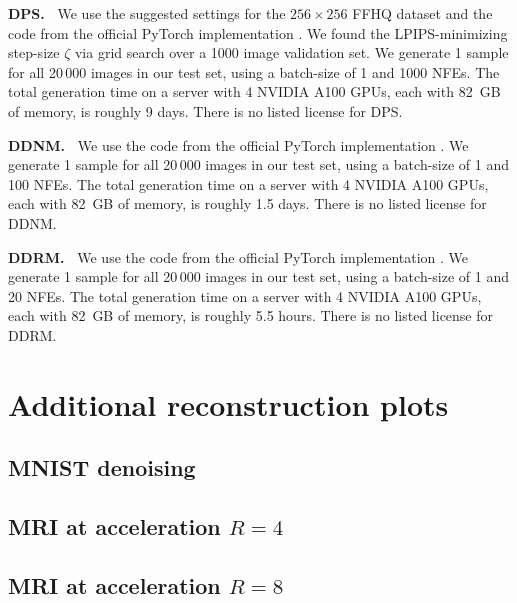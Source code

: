 \documentclass{article}
\theoremstyle{plain}
\theoremstyle{definition}
\theoremstyle{remark}
\begin{document}
\textbf{DPS.~} 
We use the suggested settings for the $256\times256$ FFHQ dataset and the code from the official PyTorch implementation \cite{Chung:github:23}.
We found the LPIPS-minimizing step-size $\zeta$ via grid search over a 1000 image validation set.
We generate 1 sample for all 20\,000 images in our test set, using a batch-size of 1 and 1000 NFEs.
The total generation time on a server with 4 NVIDIA A100 GPUs, each with 82~GB of memory, is roughly 9 days.
There is no listed license for DPS.

\textbf{DDNM.~}
We use the code from the official PyTorch implementation \cite{Wang:github:23}.
We generate 1 sample for all 20\,000 images in our test set, using a batch-size of 1 and 100 NFEs.
The total generation time on a server with 4 NVIDIA A100 GPUs, each with 82~GB of memory, is roughly 1.5 days.
There is no listed license for DDNM.

\textbf{DDRM.~}
We use the code from the official PyTorch implementation \cite{Kawar:github:22}.
We generate 1 sample for all 20\,000 images in our test set, using a batch-size of 1 and 20 NFEs.
The total generation time on a server with 4 NVIDIA A100 GPUs, each with 82~GB of memory, is roughly 5.5 hours.
There is no listed license for DDRM.

\clearpage
\section{Additional reconstruction plots}
\subsection{MNIST denoising} \label{app:mnistfigs}


\clearpage
\subsection{MRI at acceleration \texorpdfstring{$R=4$}{R=4}} \label{app:mriR4plots}


\clearpage
\subsection{MRI at acceleration \texorpdfstring{$R=8$}{R=8}} \label{app:mriR8plots}
\end{document}
